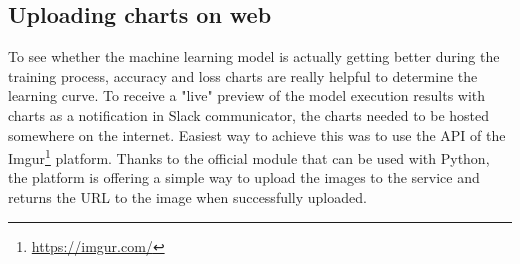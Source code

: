 \subsection{Uploading charts on web}\label{subsec:charts-web-uploading}
To see whether the machine learning model is actually getting better during the training process, accuracy and loss charts are really helpful to determine the learning curve.
To receive a "live" preview of the model execution results with charts as a notification in Slack communicator, the charts needed to be hosted somewhere on the internet.
Easiest way to achieve this was to use the API of the Imgur\footnote{\url{https://imgur.com/}} platform.
Thanks to the official module that can be used with Python, the platform is offering a simple way to upload the images to the service and returns the URL to the image when successfully uploaded.